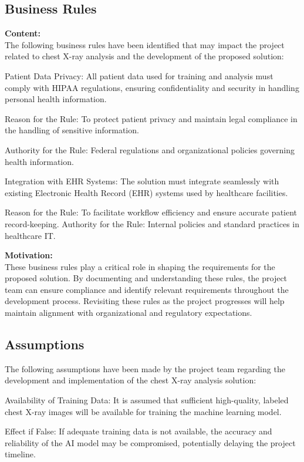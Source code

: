 \documentclass[12pt]{article}
\begin{document}
\subsection{Business Rules}
\textbf{Content:}\\
The following business rules have been identified that may impact the project related to chest 
X-ray analysis and the development of the proposed solution:

Patient Data Privacy: All patient data used for training and analysis must comply with HIPAA 
regulations, ensuring confidentiality and security in handling personal health information.

Reason for the Rule: To protect patient privacy and maintain legal compliance in the handling of 
sensitive information.

Authority for the Rule: Federal regulations and organizational policies governing health 
information.

Integration with EHR Systems: The solution must integrate seamlessly with existing Electronic 
Health Record (EHR) systems used by healthcare facilities.

Reason for the Rule: To facilitate workflow efficiency and ensure accurate patient record-keeping.
Authority for the Rule: Internal policies and standard practices in healthcare IT.

\textbf{Motivation:}\\
These business rules play a critical role in shaping the requirements for the proposed solution. 
By documenting and understanding these rules, the project team can ensure compliance and identify 
relevant requirements throughout the development process. Revisiting these rules as the project 
progresses will help maintain alignment with organizational and regulatory expectations.


\subsection{Assumptions}
The following assumptions have been made by the project team regarding the development and 
implementation of the chest X-ray analysis solution:

Availability of Training Data: It is assumed that sufficient high-quality, labeled chest X-ray 
images will be available for training the machine learning model.

Effect if False: If adequate training data is not available, the accuracy and reliability of the 
AI model may be compromised, potentially delaying the project timeline.
\end{document}
